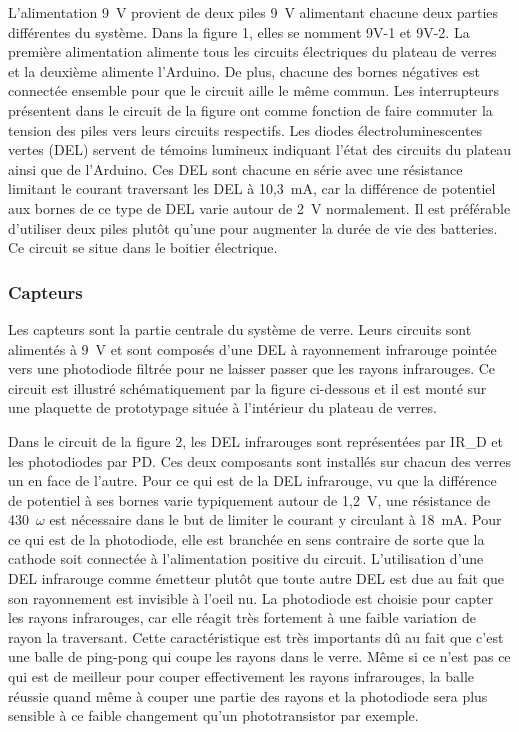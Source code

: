 L’alimentation 9~V provient de deux piles 9~V alimentant chacune deux parties différentes du système.
Dans la figure 1, elles se nomment 9V-1 et 9V-2.
La première alimentation alimente tous les circuits électriques du plateau de verres et la deuxième alimente l’Arduino.
De plus, chacune des bornes négatives est connectée ensemble pour que le circuit aille le même commun.
Les interrupteurs présentent dans le circuit de la figure ont comme fonction de faire commuter la tension des piles vers leurs circuits respectifs.
Les diodes électroluminescentes vertes (DEL) servent de témoins lumineux indiquant l’état des circuits du plateau ainsi que de l’Arduino.
Ces DEL sont chacune en série avec une résistance limitant le courant traversant les DEL à 10,3~mA, car la différence de potentiel aux bornes de ce type de DEL varie autour de 2~V normalement.
Il est préférable d’utiliser deux piles plutôt qu’une pour augmenter la durée de vie des batteries.
Ce circuit se situe dans le boitier électrique.

\subsubsection{Capteurs}

Les capteurs sont la partie centrale du système de verre.
Leurs circuits sont alimentés à 9~V et sont composés d’une DEL à rayonnement infrarouge pointée vers une photodiode filtrée pour ne laisser passer que les rayons infrarouges.
Ce circuit est illustré schématiquement par la figure ci-dessous  et il est monté sur une plaquette de prototypage située à l’intérieur du plateau de verres.


Dans le circuit de la figure 2, les DEL infrarouges sont représentées par IR\_D et les photodiodes par PD.
Ces deux composants sont installés sur chacun des verres un en face de l’autre.
Pour ce qui est de la DEL infrarouge, vu que la différence de potentiel à ses bornes varie typiquement autour de 1,2~V, une résistance de 430~$\omega$ est nécessaire dans le but de limiter le courant y circulant à 18~mA.
Pour ce qui est de la photodiode, elle est branchée en sens contraire de sorte que la cathode soit connectée à l’alimentation positive du circuit.
L’utilisation d’une DEL infrarouge comme émetteur plutôt que toute autre DEL est due au fait que son rayonnement est invisible à l'oeil nu.
La photodiode est choisie pour capter les rayons infrarouges, car elle réagit très fortement à une faible variation de rayon la traversant.
Cette caractéristique est très importants dû au fait que c’est une balle de ping-pong qui coupe les rayons dans le verre.
Même si ce n’est pas ce qui est de meilleur pour couper effectivement les rayons infrarouges, la balle réussie quand même à couper une partie des rayons et la photodiode sera plus sensible à ce faible changement qu’un phototransistor par exemple.

